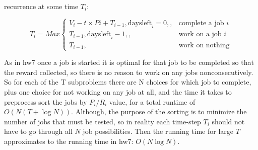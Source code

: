 \documentclass[11pt]{article}
\begin{document}
recurrence at some time $T_i$:

\begin{displaymath}
  T_i = Max  \left\{
     \begin{array}{lr}
       V_i - t\times Pi + T_{i-1},\mbox{daysleft}_{i}=0,,&\mbox{complete a job $i$}\\
       T_{i-1},\mbox{daysleft}_{i}-1,,&\mbox{work on a job $i$}\\
       T_{i-1},&\mbox{work on nothing}
     \end{array}
   \right.
\end{displaymath}

As in hw7 once a job is started it is optimal for that job to be completed so that the reward collected, so there is no reason to work on any jobs
nonconsecutively.
So for each of the T subproblems there are N choices for which job to complete, plus one choice for not working on any job at all,
and the time it takes to  preprocess sort the jobs by $P_i/R_i$ value,
for a total runtime of $O(N(T+\log N))$. Although, the purpose of the sorting is to minimize the number of jobs that must be tested, so in reality each time-step
$T_i$ should not have to go through all $N$ job possibilities. Then the running time for large $T$ approximates to the running time in hw7: $O(N\log N)$.

\label{pg:end-of-p5}


%

\newpage

% 
% 
% 
% 
% 
% 
 
\end{document}

